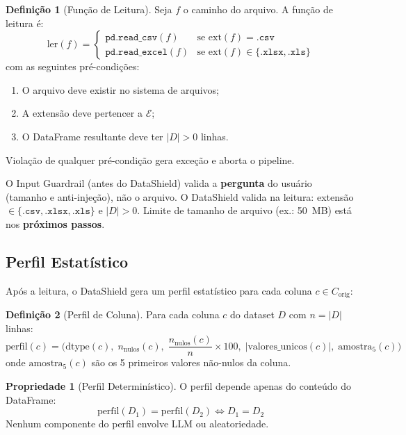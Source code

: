 \documentclass[a4paper, 12pt]{report}
\theoremstyle{definition}
\newtheorem{definicao}{Defini\c{c}\~ao}[chapter]
\newtheorem{propriedade}{Propriedade}[chapter]
\theoremstyle{remark}
\begin{document}
\begin{definicao}[Fun\c{c}\~ao de Leitura]
  Seja $f$ o caminho do arquivo. A fun\c{c}\~ao de leitura \'e:
  \[
    \text{ler}(f) = \begin{cases}
      \texttt{pd.read\_csv}(f) & \text{se } \text{ext}(f) = \texttt{.csv} \\
      \texttt{pd.read\_excel}(f) & \text{se } \text{ext}(f) \in \{\texttt{.xlsx}, \texttt{.xls}\}
    \end{cases}
  \]
  com as seguintes pr\'e-condi\c{c}\~oes:
  \begin{enumerate}
    \item O arquivo deve existir no sistema de arquivos;
    \item A extens\~ao deve pertencer a $\mathcal{E}$;
    \item O DataFrame resultante deve ter $|D| > 0$ linhas.
  \end{enumerate}
  Viola\c{c}\~ao de qualquer pr\'e-condi\c{c}\~ao gera exce\c{c}\~ao e aborta o pipeline.
\end{definicao}

\begin{caixaguardrail}
  O Input Guardrail (antes do DataShield) valida a \textbf{pergunta}
  do usu\'ario (tamanho e anti-inje\c{c}\~ao), n\~ao o arquivo.
  O DataShield valida na leitura: extens\~ao
  $\in \{\texttt{.csv},\texttt{.xlsx},\texttt{.xls}\}$ e
  $|D| > 0$. Limite de tamanho de arquivo (ex.: 50~MB) est\'a nos
  \textbf{pr\'oximos passos}.
\end{caixaguardrail}


\subsection{Perfil Estat\'istico}

Ap\'os a leitura, o DataShield gera um perfil estat\'istico
para cada coluna $c \in C_{\text{orig}}$:

\begin{definicao}[Perfil de Coluna]
  Para cada coluna $c$ do dataset $D$ com $n = |D|$ linhas:
  \[
    \text{perfil}(c) = \bigl(
      \text{dtype}(c),\;
      n_{\text{nulos}}(c),\;
      \frac{n_{\text{nulos}}(c)}{n} \times 100,\;
      |\text{valores\_unicos}(c)|,\;
      \text{amostra}_5(c)
    \bigr)
  \]
  onde $\text{amostra}_5(c)$ s\~ao os 5 primeiros valores n\~ao-nulos da coluna.
\end{definicao}

\begin{propriedade}[Perfil Determin\'istico]
  O perfil depende apenas do conte\'udo do DataFrame:
  \[
    \text{perfil}(D_1) = \text{perfil}(D_2) \iff D_1 = D_2
  \]
  Nenhum componente do perfil envolve LLM ou aleatoriedade.
\end{propriedade}
\end{document}
